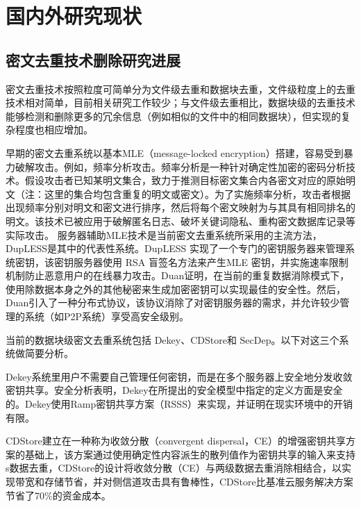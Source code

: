 \documentclass[promaster]{thesis-uestc}
\begin{document}
\section{国内外研究现状}
\subsection{密文去重技术删除研究进展}\label{ciphertext_dedup}
密文去重技术按照粒度可简单分为文件级去重和数据块去重，文件级粒度上的去重技术相对简单，目前相关研究工作较少；与文件级去重相比，数据块级的去重技术能够检测和删除更多的冗余信息（例如相似的文件中的相同数据块），但实现的复杂程度也相应增加。

早期的密文去重系统以基本\acrshort{MLE}（message-locked encryption）搭建，容易受到暴力破解攻击。例如，频率分析攻击。频率分析是一种针对确定性加密的密码分析技术。假设攻击者已知某明文集合，致力于推测目标密文集合内各密文对应的原始明文（注：这里的集合均包含重复的明文或密文）。为了实施频率分析，攻击者根据出现频率分别对明文和密文进行排序，然后将每个密文映射为与其具有相同排名的明文。该技术已被应用于破解匿名日志、破坏关键词隐私、重构密文数据库记录等实际攻击。
服务器辅助\acrshort{MLE}技术是当前密文去重系统所采用的主流方法，DupLESS是其中的代表性系统。DupLESS 实现了一个专门的密钥服务器来管理系统密钥，该密钥服务器使用 RSA 盲签名方法来产生\acrshort{MLE}
密钥，并实施速率限制机制防止恶意用户的在线暴力攻击。Duan证明，在当前的重复数据消除模式下，使用除数据本身之外的其他秘密来生成加密密钥可以实现最佳的安全性。然后，Duan引入了一种分布式协议，该协议消除了对密钥服务器的需求，并允许较少管理的系统（如P2P系统）享受高安全级别。

当前的数据块级密文去重系统包括 Dekey、CDStore和 SecDep。以下对这三个系统做简要分析。

Dekey系统里用户不需要自己管理任何密钥，而是在多个服务器上安全地分发收敛密钥共享。安全分析表明，Dekey在所提出的安全模型中指定的定义方面是安全的。Dekey使用Ramp密钥共享方案（RSSS）来实现，并证明在现实环境中的开销有限。

CDStore建立在一种称为收敛分散（convergent dispersal，CE）的增强密钥共享方案的基础上，该方案通过使用确定性内容派生的散列值作为密钥共享的输入来支持s数据去重，CDStore的设计将收敛分散（CE）与两级数据去重消除相结合，以实现带宽和存储节省，并对侧信道攻击具有鲁棒性，CDStore比基准云服务解决方案节省了70\%的资金成本。
\end{document}

